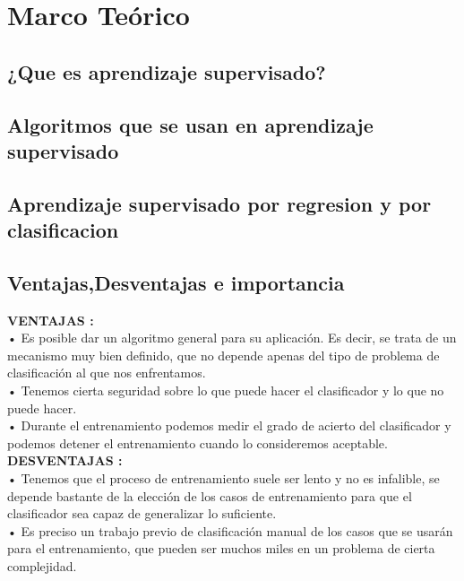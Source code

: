 \documentclass[%
 reprint,
 amsmath,amssymb,
 aps,
]{revtex4-1}
\begin{document}
\section {Marco Teórico}

\subsection{¿Que es aprendizaje supervisado?}	

\subsection{Algoritmos que se usan en aprendizaje supervisado}	


\subsection{Aprendizaje supervisado por regresion y por clasificacion}

\subsection{Ventajas,Desventajas e importancia}

  \textbf{VENTAJAS :}\\ • Es posible dar un algoritmo general para su aplicación. Es decir, se trata de un mecanismo muy bien definido, que no depende apenas del tipo de problema de clasificación al que nos enfrentamos. \\
  • Tenemos cierta seguridad sobre lo que puede hacer el clasificador y lo que no puede hacer.\\ • Durante el entrenamiento podemos medir el grado de acierto del clasificador y podemos detener el entrenamiento cuando lo consideremos aceptable.\\
  
    \textbf{DESVENTAJAS :} \\• Tenemos que el proceso de entrenamiento suele ser lento y no es infalible, se depende bastante de la elección de los casos de entrenamiento para que el clasificador sea capaz de generalizar lo suficiente.\\ • Es preciso un trabajo previo de clasificación manual de los casos que se usarán para el entrenamiento, que pueden ser muchos miles en un problema de cierta complejidad.\\
    
\end{document}
